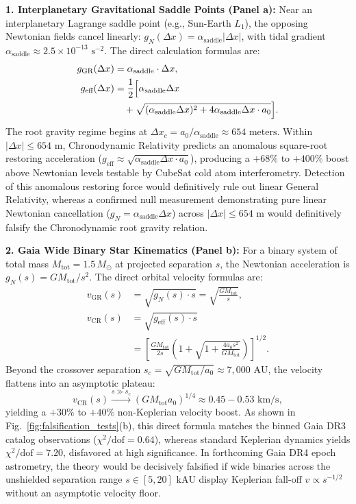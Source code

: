 \documentclass[aps,prd,reprint,superscriptaddress,nofootinbib,floatfix,amsmath,amssymb]{revtex4-2}
\begin{document}
\textbf{1. Interplanetary Gravitational Saddle Points (Panel a):} Near an interplanetary Lagrange saddle point (e.g., Sun-Earth $L_1$), the opposing Newtonian fields cancel linearly: $g_N(\Delta x) = \alpha_{\text{saddle}} |\Delta x|$, with tidal gradient $\alpha_{\text{saddle}} \approx 2.5 \times 10^{-13}\text{ s}^{-2}$. The direct calculation formulas are:
\begin{align}
g_{\text{GR}}(\Delta x) &= \alpha_{\text{saddle}} \cdot \Delta x, \label{eq:saddle_gr} \\
g_{\text{eff}}(\Delta x) &= \frac{1}{2} \Bigl[ \alpha_{\text{saddle}} \Delta x \nonumber \\
&\quad + \sqrt{(\alpha_{\text{saddle}} \Delta x)^2 + 4 \alpha_{\text{saddle}} \Delta x \cdot a_0} \Bigr]. \label{eq:saddle_cr}
\end{align}
The root gravity regime begins at $\Delta x_c = a_0 / \alpha_{\text{saddle}} \approx 654\text{ meters}$. Within $|\Delta x| \le 654\text{ m}$, Chronodynamic Relativity predicts an anomalous square-root restoring acceleration ($g_{\text{eff}} \approx \sqrt{\alpha_{\text{saddle}} \Delta x \cdot a_0}$), producing a $+68\%$ to $+400\%$ boost above Newtonian levels testable by CubeSat cold atom interferometry. Detection of this anomalous restoring force would definitively rule out linear General Relativity, whereas a confirmed null measurement demonstrating pure linear Newtonian cancellation ($g_N = \alpha_{\text{saddle}} \Delta x$) across $|\Delta x| \le 654\text{ m}$ would definitively falsify the Chronodynamic root gravity relation.

\textbf{2. Gaia Wide Binary Star Kinematics (Panel b):} For a binary system of total mass $M_{\text{tot}} = 1.5\,M_\odot$ at projected separation $s$, the Newtonian acceleration is $g_N(s) = G M_{\text{tot}} / s^2$. The direct orbital velocity formulas are:
\begin{align}
v_{\text{GR}}(s) &= \sqrt{g_N(s) \cdot s} = \sqrt{\frac{G M_{\text{tot}}}{s}}, \label{eq:v_gr_direct} \\
v_{\text{CR}}(s) &= \sqrt{g_{\text{eff}}(s) \cdot s} \nonumber \\
&= \left[ \frac{G M_{\text{tot}}}{2 s} \left( 1 + \sqrt{1 + \frac{4 a_0 s^2}{G M_{\text{tot}}}} \right) \right]^{1/2}. \label{eq:v_cr_direct}
\end{align}
Beyond the crossover separation $s_c = \sqrt{G M_{\text{tot}} / a_0} \approx 7,000\text{ AU}$, the velocity flattens into an asymptotic plateau:
\begin{equation}
v_{\text{CR}}(s) \xrightarrow{s \gg s_c} \left( G M_{\text{tot}} a_0 \right)^{1/4} \approx 0.45 - 0.53\text{ km/s},
\label{eq:v_asymptote}
\end{equation}
yielding a $+30\%$ to $+40\%$ non-Keplerian velocity boost. As shown in Fig.~\ref{fig:falsification_tests}(b), this direct formula matches the binned Gaia DR3 catalog observations ($\chi^2/\text{dof} = 0.64$), whereas standard Keplerian dynamics yields $\chi^2/\text{dof} = 7.20$, disfavored at high significance. In forthcoming Gaia DR4 epoch astrometry, the theory would be decisively falsified if wide binaries across the unshielded separation range $s \in [5, 20]\text{ kAU}$ display Keplerian fall-off $v \propto s^{-1/2}$ without an asymptotic velocity floor.
\end{document}
